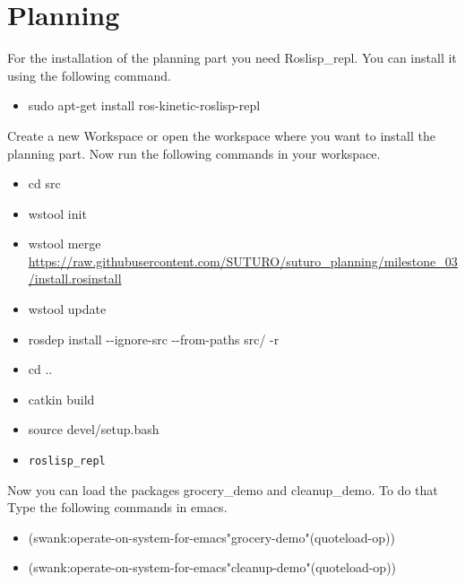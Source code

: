 \documentclass[main.tex]{subfiles}
\begin{document}
	\section{Planning}
	
	For the installation of the planning part you need Roslisp\_repl.
	You can install it using the following command.
	\begin{itemize}
	\item sudo apt-get install ros-kinetic-roslisp-repl 
	\end{itemize}

	Create a new Workspace or open the workspace where you want to install the planning part. Now run the following commands in your workspace.
	\begin{itemize}
	\item cd src
	\item wstool init
	\item wstool merge \url{https://raw.githubusercontent.com/SUTURO/suturo_planning/milestone_03/install.rosinstall}
	\item wstool update
	\item rosdep install -{}-ignore-src -{}-from-paths src/ -r
	\item cd ..
	\item catkin build
	\item source devel/setup.bash
	\item \begin{verbatim}roslisp_repl\end{verbatim}
	\end{itemize}
	
	Now you can load the packages grocery\_demo and cleanup\_demo.
	To do that Type the following commands in emacs.
	\begin{itemize}
	\item (swank:operate-on-system-for-emacs"grocery-demo"(quoteload-op))
	\item (swank:operate-on-system-for-emacs"cleanup-demo"(quoteload-op)) \end{itemize}
	
\end{document}
